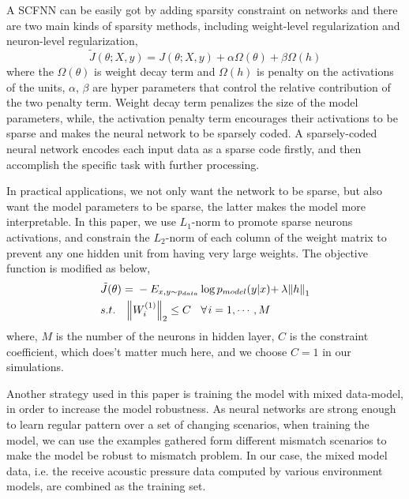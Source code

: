 A SCFNN can be easily got by adding sparsity constraint on networks and there are two main kinds of sparsity methods, including weight-level regularization and neuron-level regularization\cite{goodfellow2016deep},
\begin{equation}
\tilde J(\theta ;X,y) = J(\theta ;X,y) + \alpha \Omega (\theta )+ \beta \Omega (h)
\end{equation}
where the $\Omega (\theta )$ is weight decay term and $\Omega (h)$ is penalty on the activations of the units, $\alpha$, $\beta$ are hyper parameters that control the relative contribution of
the two penalty term. Weight decay term penalizes the size of the model parameters, while, the activation penalty term encourages their activations to be sparse and makes the neural network to be sparsely coded.
A sparsely-coded neural network encodes each input data as a sparse code firstly, and then accomplish the specific task with further processing.

In practical applications, we not only want the network to be sparse, but also want the model parameters to be sparse, the latter makes the model more interpretable. In this paper, we use $L_{1}$-norm to promote sparse neurons activations, and constrain the $L_{2}$-norm of each column of the weight matrix to prevent any one hidden unit from having very large weights. The objective function is modified as below,
\begin{equation}
\begin{split}
&\tilde J(\theta ){\kern 1pt} {\kern 1pt} {\kern 1pt} {\rm{ = }}{\kern 1pt} {\kern 1pt} {\kern 1pt}  - {E_{x,y \sim {p_{data}}}}\log {p_{model}}(y|x){\rm{ + }}{\kern 1pt} {\kern 1pt} \lambda {\left\| h \right\|_1}\\
& s.t.{\kern 1pt} {\kern 1pt} {\kern 1pt} {\kern 1pt} {\kern 1pt} {\kern 1pt} {\kern 1pt} {\kern 1pt} {\kern 1pt} {\kern 1pt} {\left\| {{W^{(1)}_i}} \right\|_2} \le C{\kern 1pt} {\kern 1pt} {\kern 1pt} {\kern 1pt} {\kern 1pt} {\kern 1pt} {\kern 1pt} {\kern 1pt} {\kern 1pt} \forall {\kern 1pt} i = 1, \cdots ,M\\
\end{split}
\end{equation}
where, $M$ is the number of the neurons in hidden layer, $C$ is the constraint coefficient, which does't matter much here, and we choose $C=1$ in our simulations.


Another strategy used in this paper is training the model with mixed data-model, in order to increase the model robustness.
As neural networks are strong enough to learn regular pattern over a set of changing scenarios,
when training the model, we can use the examples gathered form different mismatch scenarios to make the model be robust to mismatch problem. In our case, the mixed model data, i.e. the receive acoustic pressure data computed by various environment models, are combined as the training set.

